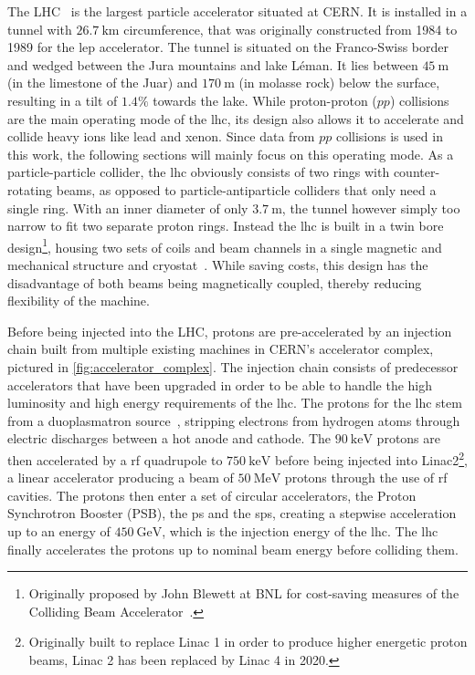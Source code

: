The LHC~\cite{Evans:1129806} is the largest particle accelerator situated at CERN. It is installed in a tunnel with $\SI{26.7}{\km}$ circumference, that was originally constructed from 1984 to 1989 for the \gls{lep} accelerator. The tunnel is situated on the Franco-Swiss border and wedged between the Jura mountains and lake Léman. It lies between $\SI{45}{\meter}$ (in the limestone of the Juar) and $\SI{170}{\meter}$ (in molasse rock) below the surface, resulting in a tilt of $1.4\%$ towards the lake.  While proton-proton ($pp$) collisions are the main operating mode of the \gls{lhc}, its design also allows it to accelerate and collide heavy ions like lead and xenon. Since data from $pp$ collisions is used in this work, the following sections will mainly focus on this operating mode. As a particle-particle collider, the \gls{lhc} obviously consists of two rings with counter-rotating beams, as opposed to particle-antiparticle colliders that only need a single ring. With an inner diameter of only $\SI{3.7}{\meter}$, the tunnel however simply too narrow to fit two separate proton rings. Instead the \gls{lhc} is built in a twin bore design\footnote{Originally proposed by John Blewett at BNL for cost-saving measures of the Colliding Beam Accelerator~\cite{Evans:1129806}.}, housing two sets of coils and beam channels in a single magnetic and mechanical structure and cryostat~\cite{Evans:1129806}. While saving costs, this design has the disadvantage of both beams being magnetically coupled, thereby reducing flexibility of the machine. 

Before being injected into the LHC, protons are pre-accelerated by an injection chain built from multiple existing machines in CERN's accelerator complex, pictured in \cref{fig:accelerator_complex}. The injection chain consists of predecessor accelerators that have been upgraded in order to be able to handle the high luminosity and high energy requirements of the \gls{lhc}. The protons for the \gls{lhc} stem from a duoplasmatron source~\cite{Scrivens:1382102}, stripping electrons from hydrogen atoms through electric discharges between a hot anode and cathode. The $\SI{90}{\keV}$ protons are then accelerated by a \gls{rf} quadrupole to $\SI{750}{\keV}$ before being injected into Linac2\footnote{Originally built to replace Linac 1 in order to produce higher energetic proton beams, Linac 2 has been replaced by Linac 4 in 2020.}, a linear accelerator producing a beam of $\SI{50}{\MeV}$ protons through the use of \gls{rf} cavities. The protons then enter a set of circular accelerators, the Proton Synchrotron Booster (PSB), the \gls{ps} and the \gls{sps}, creating a stepwise acceleration up to an energy of $\SI{450}{\GeV}$, which is the injection energy of the \gls{lhc}. The \gls{lhc} finally accelerates the protons up to nominal beam energy before colliding them. 

